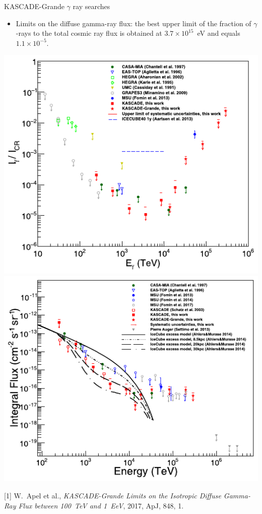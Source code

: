 \begin{frame}{KASCADE-Grande $\gamma$ ray searches}
\begin{itemize}
 \item Limits on the diffuse gamma-ray flux: the best upper limit of the fraction of $\gamma$-rays
to the total cosmic ray flux is obtained at $3.7 \times 10^{15}$~eV and equals $1.1 \times 10^{-5}$. 
\end{itemize}
\begin{center}
  \includegraphics[height=0.56\textheight]{pics/KASCADE-Grande_UHECR2016-1.pdf}
  \includegraphics[height=0.56\textheight]{pics/KASCADE-Grande_UHECR2016-2.pdf}
\end{center}
\vspace{-2ex}
\small
[1] W.~Apel et al., \textit{KASCADE-Grande Limits on the Isotropic Diffuse Gamma-Ray Flux between 100~TeV and 1~EeV}, 2017, ApJ, 848, 1.
\end{frame}


